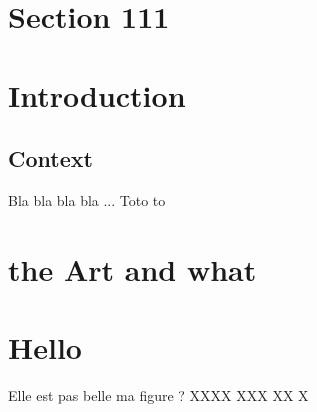 \documentclass{paper}
\begin{document}
\section{Section 111}
\section{Introduction}
\subsection{Context}
Bla bla bla bla ...
Toto to
\section{the Art and what}
\section{Hello}

Elle est pas belle ma figure ?
XXXX
XXX
XX
X
\end{document}
